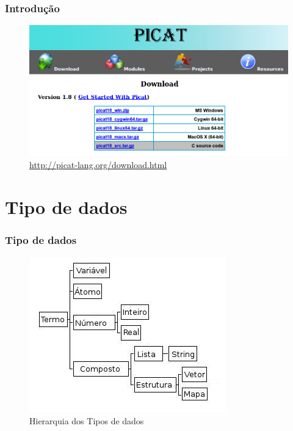 \documentclass[sans]{beamer}
\begin{document}

\begin{frame}[fragile]   %
\frametitle{Introdução}

 \begin{figure}[!ht]
 \centering
 \includegraphics[width=.8\textwidth]{picatinstall.png}
 \caption{\url{http://picat-lang.org/download.html}}
 \end{figure}

\end{frame}


\section{Tipo de dados}
\begin{frame}[fragile]   %
\frametitle{Tipo de dados}

 \begin{figure}[!ht]
 \centering
 \includegraphics[width=.6\textwidth]{tipos_dados_picat_traduzido.jpg}
 \caption{Hierarquia dos Tipos de dados}
 \end{figure}

\end{frame}
\end{document}
